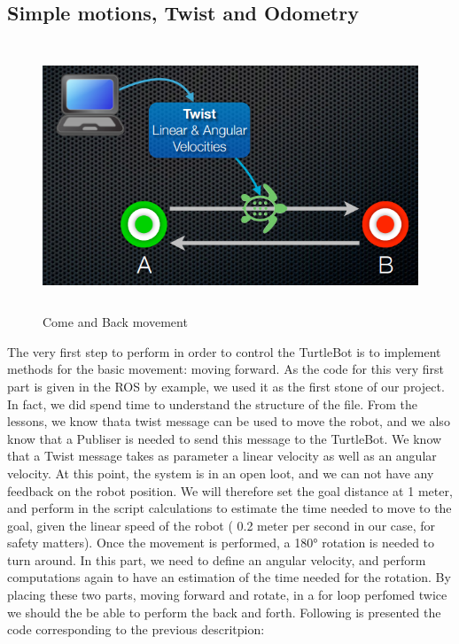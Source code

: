 \documentclass[aps,letterpaper,11pt]{revtex4}
\begin{document}
\subsection{Simple motions, Twist and Odometry
}\begin{figure}[H]
	\centering
	\includegraphics[height=8cm]{come-and-back.png}
	\caption{Come and Back movement}
	\label{fig: Come and Back movement}    
\end{figure}
The very first step to perform in order to control the TurtleBot is to implement methods for the basic movement: moving forward. As the code for this very first part is given in the ROS by example, we used it as the first stone of our project. In fact, we did spend time to understand the structure of the file. 
From the lessons, we know thata  twist message can be used to move the robot, and we also know that a Publiser is needed to send this message to the TurtleBot. We know that a Twist message takes as parameter a linear velocity as well as an angular velocity. At this point, the system is in an open loot, and we can not have any feedback on the robot position. We will therefore set the goal distance at 1 meter, and perform in the script calculations to estimate the time needed to move to the goal, given the linear speed of the robot ( 0.2 meter per second in our case, for safety matters). Once the movement is performed, a 180° rotation is needed to turn around. In this part, we need to define an angular velocity, and perform computations again to have an estimation of the time needed for the rotation. By placing these two parts, moving forward and rotate, in a for loop perfomed twice we should the be able to perform the back and forth. Following is presented the code corresponding to the previous descritpion: 
\end{document}
